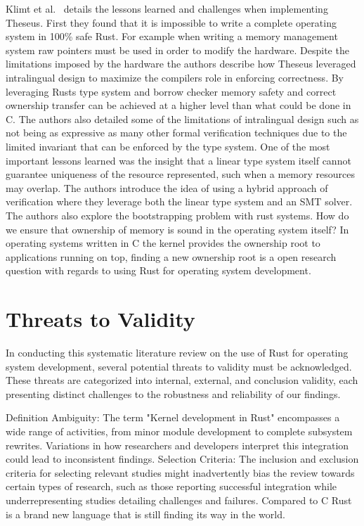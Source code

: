 \documentclass[sigconf]{acmart}
\begin{document}
Klimt et al.~\cite{Klimt2023-ob} details the lessons learned and challenges when implementing
Theseus. First they found that it is impossible to write a complete operating system in 100\% safe
Rust. For example when writing a memory management system raw pointers must be used in order to
modify the hardware. Despite the limitations imposed by the hardware the authors describe how
Theseus leveraged intralingual design to maximize the compilers role in enforcing correctness. By
leveraging Rusts type system and borrow checker memory safety and correct ownership transfer can be
achieved at a higher level than what could be done in C. The authors also detailed some of the
limitations of intralingual design such as not being as expressive as many other formal verification
techniques due to the limited invariant that can be enforced by the type system. One of the most
important lessons learned was the insight that a linear type system itself cannot guarantee
uniqueness of the resource represented, such when a memory resources may overlap. The authors
introduce the idea of using a hybrid approach of verification where they leverage both the linear
type system and an SMT solver. The authors also explore the bootstrapping problem with rust
systems. How do we ensure that ownership of memory is sound in the operating system itself? In
operating systems written in C the kernel provides the ownership root to applications running on
top, finding a new ownership root is a open research question with regards to using Rust for
operating system development.

\section{Threats to Validity}

In conducting this systematic literature review on the use of Rust for operating system development,
several potential threats to validity must be acknowledged. These threats are categorized into
internal, external, and conclusion validity, each presenting distinct challenges to the robustness
and reliability of our findings.

Definition Ambiguity: The term "Kernel development in Rust" encompasses a wide range of activities,
from minor module development to complete subsystem rewrites. Variations in how researchers and
developers interpret this integration could lead to inconsistent findings. Selection Criteria: The
inclusion and exclusion criteria for selecting relevant studies might inadvertently bias the review
towards certain types of research, such as those reporting successful integration while
underrepresenting studies detailing challenges and failures. Compared to C Rust is a brand new
language that is still finding its way in the world.
\end{document}

